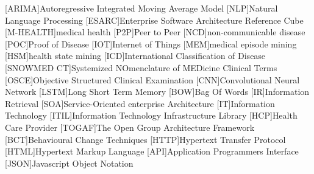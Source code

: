 \begin{acronym}[SNOWMED CT]
[ARIMA]{Autoregressive Integrated Moving Average Model}
[NLP]{Natural Language Processing}
[ESARC]{Enterprise Software Architecture Reference Cube}
[M-HEALTH]{medical health}
[P2P]{Peer to Peer}
[NCD]{non-communicable disease}
[POC]{Proof of Disease}
[IOT]{Internet of Things}
[MEM]{medical episode mining}
[HSM]{health state mining}
[ICD]{International Classification of Disease}
[SNOWMED CT]{Systemized NOmenclature of MEDicine Clinical Terms}
[OSCE]{Objective Structured Clinical Examination}
[CNN]{Convolutional Neural Network}
[LSTM]{Long Short Term Memory}
[BOW]{Bag Of Words}
[IR]{Information Retrieval}
[SOA]{Service-Oriented enterprise Architecture}
[IT]{Information Technology}
[ITIL]{Information Technology Infrastructure Library}
[HCP]{Health Care Provider}
[TOGAF]{The Open Group Architecture Framework}
[BCT]{Behavioural Change Techniques}
[HTTP]{Hypertext Transfer Protocol}
[HTML]{Hypertext Markup Language}
[API]{Application Programmers Interface}
[JSON]{Javascript Object Notation}
\end{acronym}